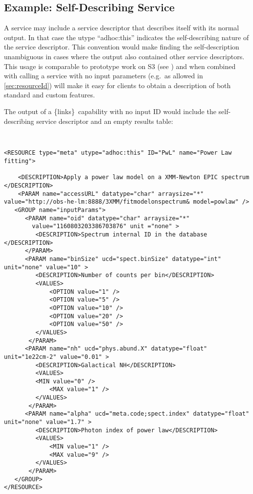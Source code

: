 \documentclass[11pt,a4paper]{ivoa}
\newcommand{\blinks}{\{links\}}
\begin{document}
\subsection{Example: Self-Describing Service}
\label{sec:selfDescribing}

A service may include a service descriptor that describes itself with
its normal output. In that case the utype ``adhoc:this'' indicates the
self-describing
nature of the service descriptor. This convention would make finding
the self-description
unambiguous in cases where the output also contained other service
descriptors.
   This usage is comparable to prototype work on S3
(see \citet{note:s3})
and when combined with calling a service with no input parameters
(e.g.\ as allowed in \ref{sec:resourceId})
will make it easy for clients to obtain a
description of both standard and custom features.

The output of a \blinks\ capability with no input ID would include the
self-describing service descriptor and an empty results table:
\begin{verbatim}


<RESOURCE type="meta" utype="adhoc:this" ID="PwL" name="Power Law fitting">

    <DESCRIPTION>Apply a power law model on a XMM-Newton EPIC spectrum </DESCRIPTION>	
	<PARAM name="accessURL" datatype="char" arraysize="*" value="http://obs-he-lm:8888/3XMM/fitmodelonspectrum& model=powlaw" />
   <GROUP name="inputParams">
      <PARAM name="oid" datatype="char" arraysize="*" 
        value="1160803203386703876" unit ="none" >
         <DESCRIPTION>Spectrum internal ID in the database </DESCRIPTION>
      </PARAM>
      <PARAM name="binSize" ucd="spect.binSize" datatype="int" unit="none" value="10" >
         <DESCRIPTION>Number of counts per bin</DESCRIPTION>
         <VALUES>
             <OPTION value="1" />
             <OPTION value="5" />
             <OPTION value="10" />
             <OPTION value="20" />
             <OPTION value="50" />
         </VALUES>
       </PARAM>
      <PARAM name="nh" ucd="phys.abund.X" datatype="float" unit="1e22cm-2" value="0.01" >
         <DESCRIPTION>Galactical NH</DESCRIPTION>
         <VALUES>
         <MIN value="0" />
             <MAX value="1" />
         </VALUES>
       </PARAM>
      <PARAM name="alpha" ucd="meta.code;spect.index" datatype="float" unit="none" value="1.7" >
         <DESCRIPTION>Photon index of power law</DESCRIPTION>
         <VALUES>
             <MIN value="1" />
             <MAX value="9" />
         </VALUES>
       </PARAM>
   </GROUP>
</RESOURCE>


\end{verbatim}
\end{document}
